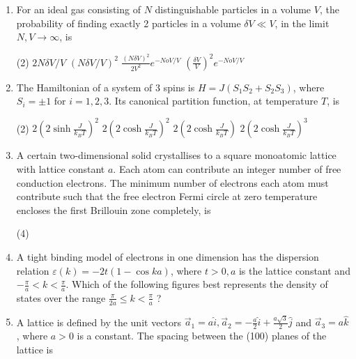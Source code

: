 \begin{enumerate}
 \begin{tasks}(4)
	 and 1
	\task[\textbf{b.}]$-2$ and 2
	 and $-1$
	\task[\textbf{d.}] $-3$ and 1
\end{tasks}
\item For an ideal gas consisting of $N$ distinguishable particles in a volume $V$, the probability of finding exactly 2 particles in a volume $\delta V \ll V$, in the limit $N, V \rightarrow \infty$, is
 \begin{tasks}(2)
	\task[\textbf{a.}] $2 N \delta V / V$
	\task[\textbf{b.}]$(N \delta V / V)^{2}$
	\task[\textbf{c.}]$\frac{(N \delta V)^{2}}{2 V^{2}} e^{-N o V / V}$
	\task[\textbf{d.}]  $\left(\frac{\delta V}{V}\right)^{2} e^{-N o V / V}$
\end{tasks}
\item The Hamiltonian of a system of 3 spins is $H=J\left(S_{1} S_{2}+S_{2} S_{3}\right)$, where $S_{i}=\pm 1$ for $i=1,2,3$. Its canonical partition function, at temperature $T$, is
 \begin{tasks}(2)
	\task[\textbf{a.}]$2\left(2 \sinh \frac{J}{k_{B} T}\right)^{2}$
	\task[\textbf{b.}]$2\left(2 \cosh \frac{J}{k_{B} T}\right)^{2}$
	\task[\textbf{c.}]$2\left(2 \cosh \frac{J}{k_{B} T}\right)$
	\task[\textbf{d.}] $2\left(2 \cosh \frac{J}{k_{B} T}\right)^{3}$
\end{tasks}
\item  A certain two-dimensional solid crystallises to a square monoatomic lattice with lattice constant $a$. Each atom can contribute an integer number of free conduction electrons. The minimum number of electrons each atom must contribute such that the free electron Fermi circle at zero temperature encloses the first Brillouin zone completely, is
 \begin{tasks}(4)
\end{tasks}
\item A tight binding model of electrons in one dimension has the dispersion relation $\varepsilon(k)=-2 t(1-\cos k a)$, where $t>0, a$ is the lattice constant and $-\frac{\pi}{a}<k<\frac{\pi}{a}$. Which of the following figures best represents the density of states over the range $\frac{\pi}{2 a} \leq k<\frac{\pi}{a}$ ?
\item A lattice is defined by the unit vectors $\vec{a}_{1}=a \hat{i}, \vec{a}_{2}=-\frac{a}{2} \hat{i}+\frac{a \sqrt{3}}{2} \hat{j}$ and $\vec{a}_{3}=a \hat{k}$, where $a>0$ is a constant. The spacing between the (100) planes of the lattice is

\end{enumerate}
